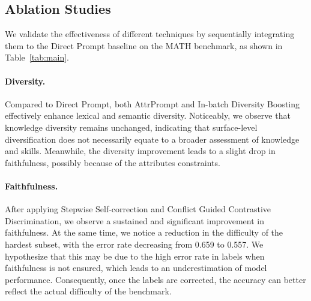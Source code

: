 \subsection{Ablation Studies}
We validate the effectiveness of different techniques by sequentially integrating them to the Direct Prompt baseline on the MATH benchmark, as shown in Table~\ref{tab:main}.
\paragraph{Diversity.}
Compared to Direct Prompt, both AttrPrompt and In-batch Diversity Boosting effectively enhance lexical and semantic diversity. Noticeably, we observe that knowledge diversity remains unchanged, indicating that surface-level diversification does not necessarily equate to a broader assessment of knowledge and skills. Meanwhile, the diversity improvement leads to a slight drop in faithfulness, possibly because of the attributes constraints.
\paragraph{Faithfulness.} 
After applying Stepwise Self-correction and Conflict Guided Contrastive Discrimination, we observe a sustained and significant improvement in faithfulness. At the same time, we notice a reduction in the difficulty of the hardest subset, with the error rate decreasing from 0.659 to 0.557. We hypothesize that this may be due to the high error rate in labels when faithfulness is not ensured, which leads to an underestimation of model performance. Consequently, once the labels are corrected, the accuracy can better reflect the actual difficulty of the benchmark.
